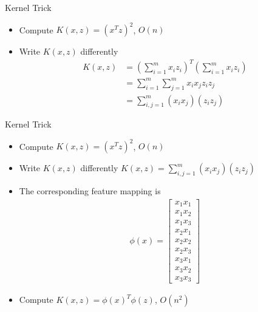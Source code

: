 \documentclass{beamer}
\begin{document}
\begin{frame}{Kernel Trick}
\begin{itemize}
	\item Compute $K(x, z) = (x^Tz)^2$, $O(n)$
	\item Write $K(x, z)$ differently
	\begin{align*}
		K(x, z) & = \left(\sum_{i=1}^mx_iz_i\right)^T\left(\sum_{i=1}^mx_iz_i\right)\\
		& = \sum_{i=1}^m\sum_{j=1}^mx_ix_jz_iz_j\\
		&=\sum_{i,j=1}^m(x_ix_j)(z_iz_j)
	\end{align*}
\end{itemize}
\end{frame}

\begin{frame}{Kernel Trick}
\begin{itemize}
	\item Compute $K(x, z) = (x^Tz)^2$, $O(n)$
	\item Write $K(x, z)$ differently $K(x, z)=\sum_{i,j=1}^m(x_ix_j)(z_iz_j)$
	\item The corresponding feature mapping is
	\begin{align*}
		\phi(x) = \begin{bmatrix}
		x_1x_1\\
		x_1x_2\\
		x_1x_3\\
		x_2x_1\\
		x_2x_2\\
		x_2x_3\\
		x_3x_1\\
		x_3x_2\\
		x_3x_3
		\end{bmatrix}
	\end{align*}
	\item Compute $K(x, z) = \phi(x)^T\phi(z)$, $O(n^2)$
\end{itemize}
\end{frame}
\end{document}
